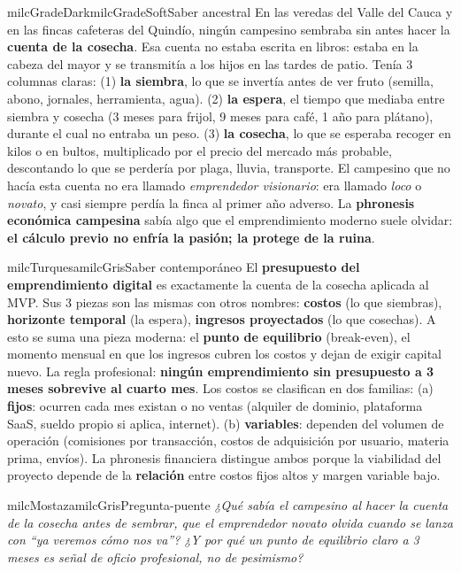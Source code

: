 \documentclass[11pt,letterpaper]{article}
\begin{document}
\begin{softbox}{milcGradeDark}{milcGradeSoft}{Saber ancestral}
En las veredas del Valle del Cauca y en las fincas cafeteras del Quindío, ningún campesino sembraba sin antes hacer la \textbf{cuenta de la cosecha}. Esa cuenta no estaba escrita en libros: estaba en la cabeza del mayor y se transmitía a los hijos en las tardes de patio. Tenía 3 columnas claras: (1) \textbf{la siembra}, lo que se invertía antes de ver fruto (semilla, abono, jornales, herramienta, agua). (2) \textbf{la espera}, el tiempo que mediaba entre siembra y cosecha (3 meses para frijol, 9 meses para café, 1 año para plátano), durante el cual no entraba un peso. (3) \textbf{la cosecha}, lo que se esperaba recoger en kilos o en bultos, multiplicado por el precio del mercado más probable, descontando lo que se perdería por plaga, lluvia, transporte. El campesino que no hacía esta cuenta no era llamado \emph{emprendedor visionario}: era llamado \emph{loco} o \emph{novato}, y casi siempre perdía la finca al primer año adverso. La \textbf{phronesis económica campesina} sabía algo que el emprendimiento moderno suele olvidar: \textbf{el cálculo previo no enfría la pasión; la protege de la ruina}.
\end{softbox}

\begin{softbox}{milcTurquesa}{milcGris}{Saber contemporáneo}
El \textbf{presupuesto del emprendimiento digital} es exactamente la cuenta de la cosecha aplicada al MVP. Sus 3 piezas son las mismas con otros nombres: \textbf{costos} (lo que siembras), \textbf{horizonte temporal} (la espera), \textbf{ingresos proyectados} (lo que cosechas). A esto se suma una pieza moderna: el \textbf{punto de equilibrio} (break-even), el momento mensual en que los ingresos cubren los costos y dejan de exigir capital nuevo. La regla profesional: \textbf{ningún emprendimiento sin presupuesto a 3 meses sobrevive al cuarto mes}. Los costos se clasifican en dos familias: (a) \textbf{fijos}: ocurren cada mes existan o no ventas (alquiler de dominio, plataforma SaaS, sueldo propio si aplica, internet). (b) \textbf{variables}: dependen del volumen de operación (comisiones por transacción, costos de adquisición por usuario, materia prima, envíos). La phronesis financiera distingue ambos porque la viabilidad del proyecto depende de la \textbf{relación} entre costos fijos altos y margen variable bajo.
\end{softbox}

\begin{softbox}{milcMostaza}{milcGris}{Pregunta-puente}
\textit{¿Qué sabía el campesino al hacer la cuenta de la cosecha antes de sembrar, que el emprendedor novato olvida cuando se lanza con \emph{``ya veremos cómo nos va''}? ¿Y por qué un punto de equilibrio claro a 3 meses es señal de oficio profesional, no de pesimismo?}
\end{softbox}
\end{document}
